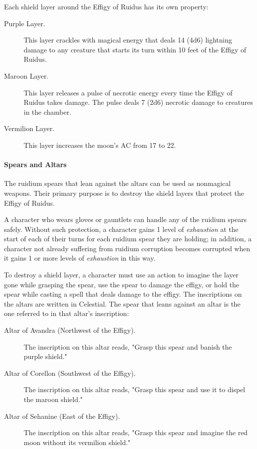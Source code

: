\documentclass[letterpaper, 11pt, bg=full, twocolumn]{dndbook}
\begin{document}
Each shield layer around the Effigy of Ruidus has its own property:

\begin{description}
\item[Purple Layer.] This layer crackles with magical energy that deals 14 (4d6) lightning damage to any creature that starts its turn within 10 feet of the Effigy of Ruidus.
\item[Maroon Layer.] This layer releases a pulse of necrotic energy every time the Effigy of Ruidus takes damage. The pulse deals 7 (2d6) necrotic damage to creatures in the chamber.
\item[Vermilion Layer.] This layer increases the moon's AC from 17 to 22.
\end{description}

\paragraph{Spears and Altars}

The ruidium spears that lean against the altars can be used as nonmagical weapons. Their primary purpose is to destroy the shield layers that protect the Effigy of Ruidus.

A character who wears gloves or gauntlets can handle any of the ruidium spears safely. Without such protection, a character gains 1 level of \textit{exhaustion} at the start of each of their turns for each ruidium spear they are holding; in addition, a character not already suffering from ruidium corruption becomes corrupted when it gains 1 or more levels of \textit{exhaustion} in this way.

To destroy a shield layer, a character must use an action to imagine the layer gone while grasping the spear, use the spear to damage the effigy, or hold the spear while casting a spell that deals damage to the effigy. The inscriptions on the altars are written in Celestial. The spear that leans against an altar is the one referred to in that altar's inscription:

\begin{description}
\item[Altar of Avandra (Northwest of the Effigy).] The inscription on this altar reads, "Grasp this spear and banish the purple shield."
\item[Altar of Corellon (Southwest of the Effigy).] The inscription on this altar reads, "Grasp this spear and use it to dispel the maroon shield."
\item[Altar of Sehanine (East of the Effigy).] The inscription on this altar reads, "Grasp this spear and imagine the red moon without its vermilion shield."
\end{description}
\end{document}
